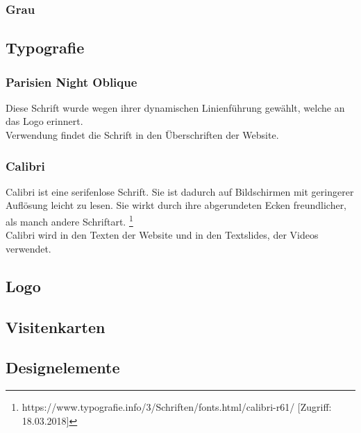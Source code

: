 \subsubsection{Grau}
\subsection{Typografie}
\subsubsection{Parisien Night Oblique}
\renewcommand{\kapitelautor}{Autor: Niklas Kienreich}
Diese Schrift wurde wegen ihrer dynamischen Linienführung gewählt, welche an das Logo erinnert.
\\
Verwendung findet die Schrift in den Überschriften der Website.


\subsubsection{Calibri}
\renewcommand{\kapitelautor}{Autor: Niklas Kienreich}
Calibri ist eine serifenlose Schrift. Sie ist dadurch auf Bildschirmen mit geringerer Auflösung leicht zu lesen. Sie wirkt durch ihre abgerundeten Ecken freundlicher, als manch andere Schriftart. \footnote{\label{foot:2} https://www.typografie.info/3/Schriften/fonts.html/calibri-r61/ [Zugriff: 18.03.2018]}
\\
Calibri wird in den Texten der Website und in den Textslides, der Videos verwendet.


\subsection{Logo}
\subsection{Visitenkarten}
\subsection{Designelemente}